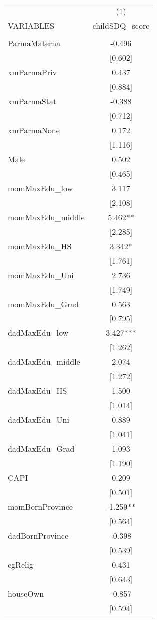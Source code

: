 \documentclass[]{article}
\begin{document}
\begin{tabular}{lc} \hline
 & (1) \\
VARIABLES & childSDQ\_score \\ \hline
 &  \\
ParmaMaterna & -0.496 \\
 & [0.602] \\
xmParmaPriv & 0.437 \\
 & [0.884] \\
xmParmaStat & -0.388 \\
 & [0.712] \\
xmParmaNone & 0.172 \\
 & [1.116] \\
Male & 0.502 \\
 & [0.465] \\
momMaxEdu\_low & 3.117 \\
 & [2.108] \\
momMaxEdu\_middle & 5.462** \\
 & [2.285] \\
momMaxEdu\_HS & 3.342* \\
 & [1.761] \\
momMaxEdu\_Uni & 2.736 \\
 & [1.749] \\
momMaxEdu\_Grad & 0.563 \\
 & [0.795] \\
dadMaxEdu\_low & 3.427*** \\
 & [1.262] \\
dadMaxEdu\_middle & 2.074 \\
 & [1.272] \\
dadMaxEdu\_HS & 1.500 \\
 & [1.014] \\
dadMaxEdu\_Uni & 0.889 \\
 & [1.041] \\
dadMaxEdu\_Grad & 1.093 \\
 & [1.190] \\
CAPI & 0.209 \\
 & [0.501] \\
momBornProvince & -1.259** \\
 & [0.564] \\
dadBornProvince & -0.398 \\
 & [0.539] \\
cgRelig & 0.431 \\
 & [0.643] \\
houseOwn & -0.857 \\
 & [0.594] \\

\end{tabular}
\end{document}
